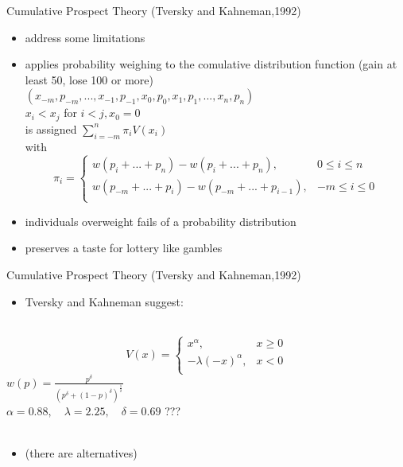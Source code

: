 \documentclass[11pt,aspectratio=169]{beamer}
\begin{document}
\begin{frame}{Cumulative Prospect Theory (Tversky and Kahneman,1992)}
    \begin{itemize}
        \item address some limitations\\
        \item applies probability weighing to the comulative distribution function \medskip
        (gain at least 50, lose 100 or more)\\
        $(x_{-m},p_{-m},...,x_{-1},p_{-1},x_0,p_0,x_1,p_1,...,x_n,p_n)$ \\
        $x_i < x_j$ for $i<j,x_0=0$ \\
        is assigned \qquad
        $ \sum_{i=-m}^{n} \pi_i V(x_i)$\\
        with\\
            \begin{equation}
                \pi_i = \begin{cases}
                w(p_i+...+p_n) - w(p_i+...+p_n),  & 0\leq i \leq  n\\
                w(p_{-m}+...+p_i) - w(p_{-m}+...+p_{i-1}),  & -m\leq i \leq 0\\
            \end{cases}
            \end{equation}\medskip
        \item individuals overweight fails of a probability distribution\\
        \item preserves a taste for lottery like gambles
    \end{itemize}
\end{frame}

\begin{frame}{Cumulative Prospect Theory (Tversky and Kahneman,1992)}
    \begin{itemize}
        \item Tversky and Kahneman suggest:\\
    \end{itemize}
    \hspace*{\fill} \\
\begin{equation}
    V(x) = \begin{cases}
    x^\alpha,  & x\geq 0\\
    -\lambda (-x)^\alpha,  & x< 0\\
    \end{cases}
\end{equation}\medskip
\centering $ w(p) = \frac{p^{\delta}}{(p^{\delta}+(1-p)^{\delta})^{\frac{1}{\delta}}} $\\
$\alpha =0.88 ,\quad \lambda =2.25, \quad \delta =0.69 $ ??? \\
\hspace*{\fill} \\
\begin{itemize}
    \item (there are alternatives)\\
\end{itemize}
\end{frame}
\end{document}
